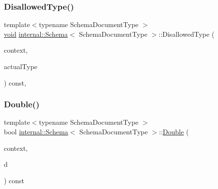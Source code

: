 \mbox{\label{classinternal_1_1Schema_a6c88cbcc1abfdfdafdf893662118564e}} 
\subsubsection{\texorpdfstring{Disallowed\+Type()}{DisallowedType()}}
{\footnotesize\ttfamily template$<$typename Schema\+Document\+Type $>$ \\
\hyperlink{imgui__impl__opengl3__loader_8h_ac668e7cffd9e2e9cfee428b9b2f34fa7}{void} \hyperlink{classinternal_1_1Schema}{internal\+::\+Schema}$<$ Schema\+Document\+Type $>$\+::Disallowed\+Type (\begin{DoxyParamCaption}\item[{\hyperlink{classinternal_1_1Schema_ac3f54abfefe300c5610c1205869cfd66}{Context} \&}]{context,  }\item[{const \hyperlink{classinternal_1_1Schema_a8976b6d7e2a885483d0b51d941019340}{Value\+Type} \&}]{actual\+Type }\end{DoxyParamCaption}) const\hspace{0.3cm}{\ttfamily [inline]}, {\ttfamily [private]}}

\mbox{\label{classinternal_1_1Schema_a8336bcea8d0e802c4b070da18e04f1dd}} 
\subsubsection{\texorpdfstring{Double()}{Double()}}
{\footnotesize\ttfamily template$<$typename Schema\+Document\+Type $>$ \\
bool \hyperlink{classinternal_1_1Schema}{internal\+::\+Schema}$<$ Schema\+Document\+Type $>$\+::\hyperlink{classinternal_1_1Double}{Double} (\begin{DoxyParamCaption}\item[{\hyperlink{classinternal_1_1Schema_ac3f54abfefe300c5610c1205869cfd66}{Context} \&}]{context,  }\item[{double}]{d }\end{DoxyParamCaption}) const\hspace{0.3cm}{\ttfamily [inline]}}

